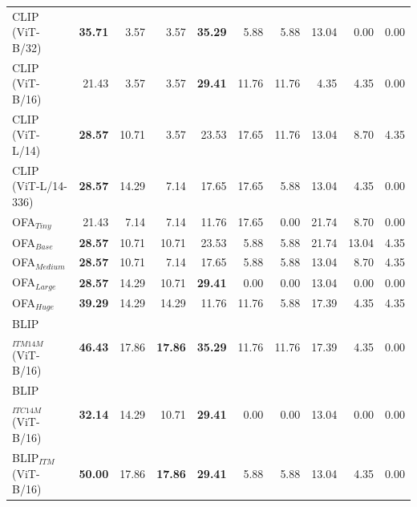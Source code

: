 \begin{table}[ht]
\begin{adjustbox}{max width=\textwidth}
\begin{tabular}{l|rrr|rrr|rrr}
 CLIP (ViT-B/32)                     & \textbf{35.71} & 3.57           & 3.57           & \textbf{35.29} & 5.88           & 5.88           & 13.04          & 0.00           & 0.00           \\
 CLIP (ViT-B/16)                     & 21.43          & 3.57           & 3.57           & \textbf{29.41} & 11.76          & 11.76          & 4.35           & 4.35           & 0.00           \\
 CLIP (ViT-L/14)                     & \textbf{28.57} & 10.71          & 3.57           & 23.53          & 17.65          & 11.76          & 13.04          & 8.70           & 4.35           \\
 CLIP (ViT-L/14-336)                 & \textbf{28.57} & 14.29          & 7.14           & 17.65          & 17.65          & 5.88           & 13.04          & 4.35           & 0.00           \\
 OFA$_{Tiny}$                        & 21.43          & 7.14           & 7.14           & 11.76          & 17.65          & 0.00           & 21.74          & 8.70           & 0.00           \\
 OFA$_{Base}$                        & \textbf{28.57} & 10.71          & 10.71          & 23.53          & 5.88           & 5.88           & 21.74          & 13.04          & 4.35           \\
 OFA$_{Medium}$                      & \textbf{28.57} & 10.71          & 7.14           & 17.65          & 5.88           & 5.88           & 13.04          & 8.70           & 4.35           \\
 OFA$_{Large}$                       & \textbf{28.57} & 14.29          & 10.71          & \textbf{29.41} & 0.00           & 0.00           & 13.04          & 0.00           & 0.00           \\
 OFA$_{Huge}$                        & \textbf{39.29} & 14.29          & 14.29          & 11.76          & 11.76          & 5.88           & 17.39          & 4.35           & 4.35           \\
 BLIP$_{ITM 14M}$ (ViT-B/16)         & \textbf{46.43} & 17.86          & \textbf{17.86} & \textbf{35.29} & 11.76          & 11.76          & 17.39          & 4.35           & 0.00           \\
 BLIP$_{ITC 14M}$ (ViT-B/16)         & \textbf{32.14} & 14.29          & 10.71          & \textbf{29.41} & 0.00           & 0.00           & 13.04          & 0.00           & 0.00           \\
 BLIP$_{ITM}$ (ViT-B/16)             & \textbf{50.00} & 17.86          & \textbf{17.86} & \textbf{29.41} & 5.88           & 5.88           & 13.04          & 4.35           & 0.00           \\

\end{tabular}
\end{adjustbox}
\end{table}
